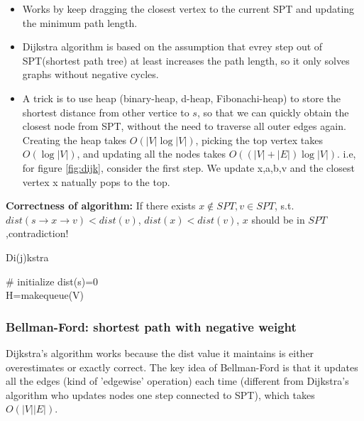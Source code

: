 \begin{itemize}
    \item Works by keep dragging the closest vertex to the current SPT and updating the minimum path length. 
    \item Dijkstra algorithm is based on the assumption that evrey step out of SPT(shortest path tree) at least increases the path length, so it only solves graphs without negative cycles.
    \item A trick is to use heap (binary-heap, d-heap, Fibonachi-heap) to store the shortest distance from other vertice to $s$, so that we can quickly obtain the closest node from SPT, without the need to traverse all outer edges again. 
    Creating the heap takes $O(|V|\log |V|)$, picking the top vertex takes $O(\log |V|)$, and updating all the nodes takes $O((|V|+|E|)\log |V|)$.
    i.e, for figure \ref{fig:dijk},  consider the first step. We update {x,a,b,v} and the closest vertex x natually pops to the top.
\end{itemize}
\textbf{Correctness of algorithm:}
If there exists $x \notin SPT, v \in SPT$, s.t. $dist(s\rightarrow x \rightarrow v)<dist(v)$, $dist(x)<dist(v)$, $x$ should be in $SPT$,contradiction! 
\begin{algorithm}
\caption{Di(j)kstra}
\# initialize
dist(s)=0\\
H=makequeue(V)\\

\end{algorithm}

\subsubsection{Bellman-Ford: shortest path with negative weight}
Dijkstra's algorithm works because the dist value it maintains is either overestimates or exactly correct.
The key idea of Bellman-Ford is that it updates all the edges (kind of 'edgewise' operation) each time (different from Dijkstra's algorithm who updates nodes one step connected to SPT), which takes $O(|V||E|)$.

